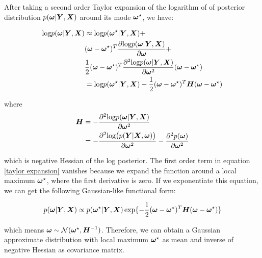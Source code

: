 After taking a second order Taylor expansion of the logarithm of of posterior distribution $p(\boldsymbol \omega | \boldsymbol Y, \boldsymbol X)$ around its mode $\boldsymbol \omega^\star$, we have:

\begin{equation}
\begin{aligned} \label{taylor expansion}
\text{log} p(\boldsymbol \omega| \boldsymbol Y, \boldsymbol X) &\approx 
\text{log}p(\boldsymbol \omega^\star|\boldsymbol Y, \boldsymbol X) + \\
&(\boldsymbol \omega - \boldsymbol \omega^\star)^T\frac{\partial \text{log} p(\boldsymbol \omega| \boldsymbol Y, \boldsymbol X)}{\partial \boldsymbol \omega} + \\
&\frac{1}{2}(\boldsymbol \omega - \boldsymbol \omega^\star)^T\frac{\partial^2\text{log} p(\boldsymbol \omega |\boldsymbol Y, \boldsymbol X)}{\partial \boldsymbol \omega^2}(\boldsymbol \omega - \boldsymbol \omega^\star)\\
&= \text{log}p(\boldsymbol \omega^\star|\boldsymbol Y, \boldsymbol X) - \frac{1}{2}(\boldsymbol \omega - \boldsymbol \omega^\star)^T\boldsymbol H(\boldsymbol \omega - \boldsymbol \omega^\star)
\end{aligned}
\end{equation}


where 
\[
\begin{aligned}
\boldsymbol H &= -\frac{\partial^2\text{log} p(\boldsymbol \omega|\boldsymbol Y, \boldsymbol X)}{\partial \boldsymbol \omega^2}\\
&=-\frac{\partial^2\text{log}\big(p(\boldsymbol Y|\boldsymbol X, \boldsymbol \omega)\big)}{\partial \boldsymbol \omega^2} - \frac{\partial^2p(\boldsymbol \omega)}{\partial\boldsymbol \omega^2}
\end{aligned}
\]

which is negative Hessian of the log posterior. The first order term in equation \ref{taylor expansion} vanishes because we expand the function around a local maximum $\boldsymbol \omega^\star$, where the first derivative is zero. If we exponentiate this equation, we can get the following Gaussian-like functional form: 

\begin{equation}
\begin{aligned}\label{gaussian form}
p(\boldsymbol \omega | \boldsymbol Y, \boldsymbol X) \propto p(\boldsymbol \omega^\star|\boldsymbol Y, \boldsymbol X)\exp\{-\frac{1}{2}(\boldsymbol \omega - \boldsymbol \omega^\star)^T\boldsymbol H (\boldsymbol \omega - \boldsymbol \omega^\star)\}
\end{aligned}
\end{equation}

which means $\boldsymbol \omega \sim \mathcal N(\boldsymbol \omega^\star, \boldsymbol H ^{-1})$. Therefore, we can obtain a Gaussian approximate distribution with local maximum $\boldsymbol \omega^\star$ as mean and inverse of negative Hessian as covariance matrix.

